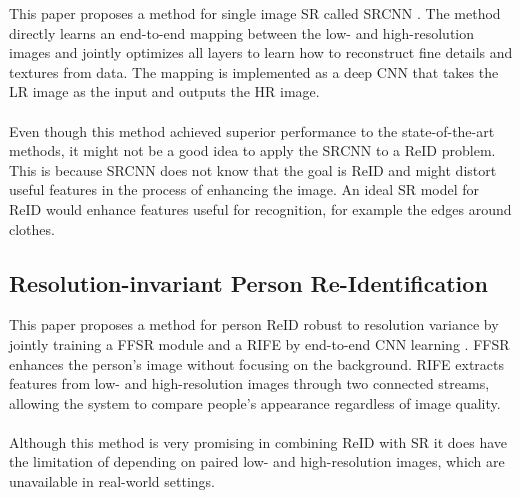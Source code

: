 This paper proposes a method for single image \ac{SR} called \ac{SRCNN} \cite{SRCNN}. The method directly learns an end-to-end mapping between the low- and high-resolution images and jointly optimizes all layers to learn how to reconstruct fine details and textures from data. The mapping is implemented as a deep \ac{CNN} that takes the \ac{LR} image as the input and outputs the \ac{HR} image.
\\\\
Even though this method achieved superior performance to the state-of-the-art methods, it might not be a good idea to apply the \ac{SRCNN} to a \ac{ReID} problem. This is because \ac{SRCNN} does not know that the goal is \ac{ReID} and might distort useful features in the process of enhancing the image. An ideal \ac{SR} model for \ac{ReID} would enhance features useful for recognition, for example the edges around clothes. 	

\subsection{Resolution-invariant Person Re-Identification} 

This paper proposes a method for person \ac{ReID} robust to resolution variance by jointly training a \ac{FFSR} module and a \ac{RIFE} by end-to-end \ac{CNN} learning \cite{FFSR}. \ac{FFSR} enhances the person’s image without focusing on the background. \ac{RIFE} extracts features from low- and high-resolution images through two connected streams, allowing the system to compare people’s appearance regardless of image quality. 
\\\\
Although this method is very promising in combining \ac{ReID} with \ac{SR} it does have the limitation of depending on paired low- and high-resolution images, which are unavailable in real-world settings. 
